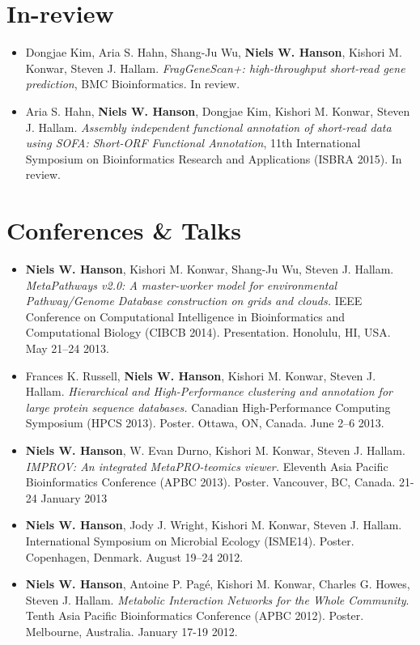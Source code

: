 \documentclass[print]{hanson_cv} %
\begin{document}
\section{In-review}
\begin{itemize}
\item
  Dongjae Kim, Aria S. Hahn, Shang-Ju Wu, \textbf{Niels W. Hanson}, Kishori M. Konwar, Steven J. Hallam. \emph{FragGeneScan+: high-throughput short-read gene prediction}, BMC Bioinformatics. In review.
\item
  Aria S. Hahn, \textbf{Niels W. Hanson}, Dongjae Kim, Kishori M. Konwar, Steven J. Hallam. \emph{Assembly independent functional annotation of short-read data using SOFA: Short-ORF Functional Annotation}, 11th International Symposium on Bioinformatics Research and Applications (ISBRA 2015). In review.
\end{itemize}

\section{Conferences \& Talks}
\begin{itemize}
\item
  \textbf{Niels W. Hanson}, Kishori M. Konwar, Shang-Ju Wu, Steven J.
  Hallam. \emph{MetaPathways v2.0: A master-worker model for
  environmental Pathway/Genome Database construction on grids and
  clouds.} IEEE Conference on Computational Intelligence in
  Bioinformatics and Computational Biology (CIBCB 2014). Presentation.
  Honolulu, HI, USA. May 21--24 2013.
\item
  Frances K. Russell, \textbf{Niels W. Hanson}, Kishori M. Konwar,
  Steven J. Hallam. \emph{Hierarchical and High-Performance clustering
  and annotation for large protein sequence databases.} 
  Canadian High-Performance Computing Symposium (HPCS 2013). Poster. Ottawa,
  ON, Canada. June 2--6 2013.
\item
  \textbf{Niels W. Hanson}, W. Evan Durno, Kishori M. Konwar, Steven J.
  Hallam. \emph{IMPROV: An integrated MetaPRO-teomics viewer.} Eleventh Asia Pacific Bioinformatics Conference (APBC 2013). Poster. Vancouver, BC, Canada. 21-24 January 2013
\item \textbf{Niels W. Hanson}, Jody J. Wright, Kishori M. Konwar, Steven J. Hallam. International Symposium on Microbial Ecology (ISME14). Poster. Copenhagen, Denmark. August 19--24 2012.
\item
  \textbf{Niels W. Hanson}, Antoine P. Pag\'{e}, Kishori M. Konwar, Charles
  G. Howes, Steven J. Hallam. \emph{Metabolic Interaction Networks for
  the Whole Community}. Tenth Asia Pacific Bioinformatics Conference (APBC 2012). Poster. Melbourne, Australia. January 17-19 2012.
\end{itemize}
\end{document}
